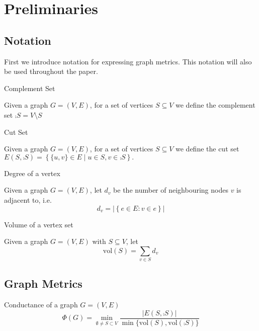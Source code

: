 \section{Preliminaries}
\label{Prelims}

\subsection{Notation}

First we introduce notation for expressing graph metrics. This notation will also be used throughout the paper. %

\begin{definition}
	Complement Set

	\noindent
	Given a graph $G = (V, E)$, for a set of vertices $S \subseteq V$ we define the complement set $\comp{S} = V \setminus S$
\end{definition}

\begin{definition}
	Cut Set

	\noindent
	Given a graph $G = (V, E)$, for a set of vertices $S \subseteq V$ we define the cut set $ E(S, \comp{S}) = \left\{\{u, v\} \in E \mid u \in S, v \in \comp{S} \right\}.$
\end{definition}

\begin{definition}
	Degree of a vertex

	\noindent
	Given a graph $G = (V, E)$, let $d_v$ be the number of neighbouring nodes $v$ is adjacent to, i.e. $$
		d_v = |\left\{ e \in E : v \in e \right\}|
	$$
\end{definition}

\begin{definition}
	Volume of a vertex set

	\noindent
	Given a graph $G = (V, E)$ with $S \subseteq V$, let 
	$$
		\text{vol}(S) = \sum_{v \in S} d_v
	$$
\end{definition}


\subsection{Graph Metrics}\label{subsect:graphMetrics}

\begin{definition}
	Conductance of a graph $G = (V, E)$
	$$
		\Phi(G) = \min_{\emptyset \neq S \subset V} \frac{|E(S, \comp{S})|}{\min\{\text{vol}(S), \text{vol}(\comp{S})\}}
	$$
\end{definition}

